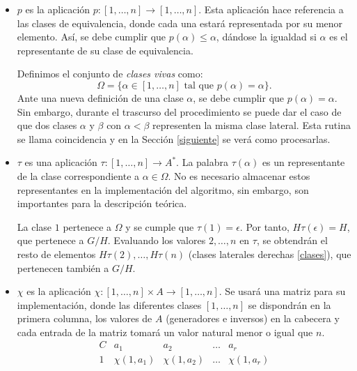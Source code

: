 \begin{itemize}


    \item $p$ es la aplicación $p: [1,\ldots,n] \to [1,\ldots,n]$. Esta aplicación hace referencia a las clases de equivalencia, donde cada una estará representada por su menor elemento. Así, se debe cumplir que $p(\alpha) \leq \alpha$, dándose la igualdad si $\alpha$ es el representante de su clase de equivalencia. 
    
    
    Definimos el conjunto de \textit{clases vivas} como:
    \[
        \Omega = \{ \alpha \in [1,\ldots,n] \text{ tal que } p(\alpha)=\alpha \}.
    \]
    Ante una nueva definición de una clase $\alpha$, se debe cumplir que $p(\alpha)=\alpha$. Sin embargo,  durante el trascurso del procedimiento se puede dar el caso de que dos clases $\alpha$ y $\beta$ con $\alpha < \beta$ representen la misma clase lateral. Esta rutina se llama coincidencia y en la Sección \ref{siguiente} se verá como procesarlas.


    \item $\tau$ es una aplicación $\tau : [1,\ldots,n] \to A^*$. La palabra $\tau(\alpha)$ es un representante de la clase correspondiente a $\alpha \in \Omega$. No es necesario almacenar estos representantes en la implementación del algoritmo, sin embargo, son importantes para la descripción teórica.
    
    La clase $1$ pertenece a $\Omega$ y se cumple que $\tau(1)=\epsilon$. Por tanto, $H \tau(\epsilon)= H$, que pertenece a $G/H$.
    Evaluando los valores $2, \ldots , n$ en $\tau$, se obtendrán el resto de elementos $H\tau(2), \ldots, H\tau(n)$ (clases laterales derechas \ref{clases}), que pertenecen también a $G/H$.
    
    
    
    
    \item  $\chi$ es la aplicación $\chi : [1,\ldots,n] \times A \to [1,\ldots,n]$. Se usará una matriz para su implementación, donde las diferentes clases $[1,\ldots,n]$ se dispondrán en la primera columna, los valores de $A$ (generadores e inversos) en la cabecera y cada entrada de la matriz tomará un valor natural menor o igual que $n$. 
   \[
    \begin{array}{c|*{4}{c}}{C}&a_1&a_2&\ldots&a_r\\\hline
    {}1&\chi(1, a_1)  &\chi(1, a_2)   &\ldots   &\chi(1, a_r)\\


\end{array}\]
\end{itemize}

